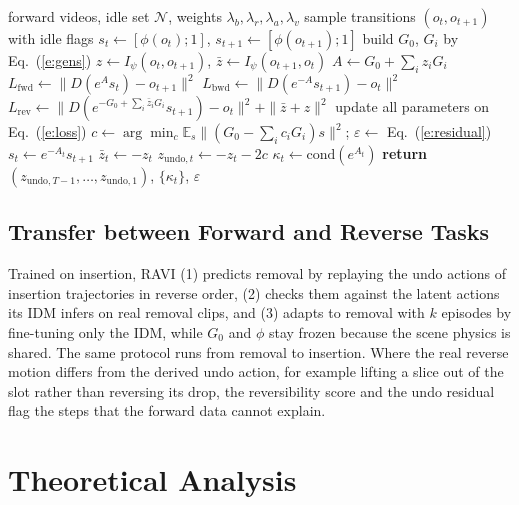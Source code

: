 \documentclass{jcse}
\newcommand{\method}{RAVI}
\newcommand{\zb}{\bar{z}}
\newcommand{\cond}{\mathrm{cond}}
\begin{document}
\begin{algorithm}[t]
\caption{{\method}: training on forward videos and closed-form reverse quantities}\label{a:wao}
\begin{algorithmic}[1]
\Require forward videos, idle set $\mathcal{N}$, weights $\lambda_b,\lambda_r,\lambda_a,\lambda_v$
\Repeat
	\State sample transitions $(o_t,o_{t+1})$ with idle flags
	\State $s_t\gets[\phi(o_t);1]$, $s_{t+1}\gets[\phi(o_{t+1});1]$
	\State build $G_0$, $G_i$ by Eq.~(\ref{e:gens})
	\State $z\gets I_\psi(o_t,o_{t+1})$, $\zb\gets I_\psi(o_{t+1},o_t)$
	\State $A\gets G_0+\sum_iz_iG_i$
	\State $L_{\mathrm{fwd}}\gets\|D(e^{A}s_t)-o_{t+1}\|^2$
	\State $L_{\mathrm{bwd}}\gets\|D(e^{-A}s_{t+1})-o_t\|^2$
	\State $L_{\mathrm{rev}}\gets\|D(e^{-G_0+\sum_i\zb_iG_i}s_{t+1})-o_t\|^2+\|\zb+z\|^2$
	\State update all parameters on Eq.~(\ref{e:loss})
\State $c\gets\arg\min_c\mathbb{E}_s\|(G_0-\sum_ic_iG_i)s\|^2$; $\varepsilon\gets$ Eq.~(\ref{e:residual})
	\State $s_t\gets e^{-A_t}s_{t+1}$ 
	\State $\zb_t\gets-z_t$ 
	\State $z_{\mathrm{undo},t}\gets-z_t-2c$ 
	\State $\kappa_t\gets\cond(e^{A_t})$ 
\EndFor
\State \textbf{return} $(z_{\mathrm{undo},T-1},\dots,z_{\mathrm{undo},1})$, $\{\kappa_t\}$, $\varepsilon$
\end{algorithmic}
\end{algorithm}

\subsection{Transfer between Forward and Reverse Tasks}
Trained on insertion, {\method} (1) predicts removal by replaying the undo actions of insertion trajectories in reverse order, (2) checks them against the latent actions its IDM infers on real removal clips, and (3) adapts to removal with $k$ episodes by fine-tuning only the IDM, while $G_0$ and $\phi$ stay frozen because the scene physics is shared.
The same protocol runs from removal to insertion.
Where the real reverse motion differs from the derived undo action, for example lifting a slice out of the slot rather than reversing its drop, the reversibility score and the undo residual flag the steps that the forward data cannot explain.

\section{Theoretical Analysis} \label{s:theory}
\end{document}
